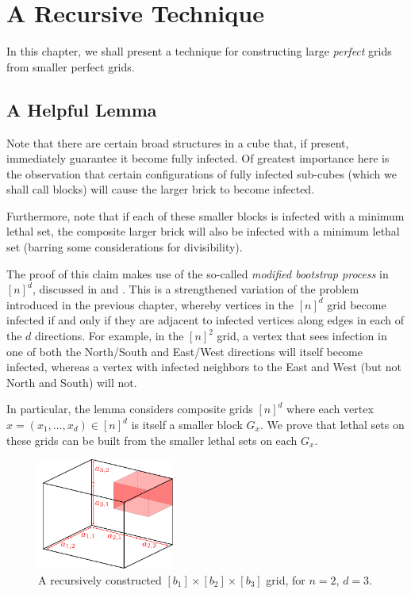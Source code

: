 \chapter{A Recursive Technique}

In this chapter, we shall present a technique for constructing large \emph{perfect} grids from smaller perfect grids. 

\section{A Helpful Lemma}

Note that there are certain broad structures in a cube that, if present, immediately guarantee it become fully infected. Of greatest importance here is the observation that certain configurations of fully infected sub-cubes (which we shall call blocks) will cause the larger brick to become infected. 


Furthermore, note that if each of these smaller blocks is infected with a minimum lethal set, the composite larger brick will also be infected with a minimum lethal set (barring some considerations for divisibility).

The proof of this claim makes use of the so-called \emph{modified bootstrap process} in $[n]^d$, discussed in \cite{some paper} and \cite{some other paper}. This is a strengthened variation of the problem introduced in the previous chapter, whereby vertices in the $[n]^d$ grid become infected if and only if they are adjacent to infected vertices along edges in each of the $d$ directions. For example, in the $[n]^2$ grid, a vertex that sees infection in one of both the North/South and East/West directions will itself become infected, whereas a vertex with infected neighbors to the East and West (but not North and South) will not. 

In particular, the lemma considers composite grids $[n]^d$ where each vertex $x = (x_1, \dots, x_d) \in [n]^d$ is itself a smaller block $G_x$. We prove that lethal sets on these grids can be built from the smaller lethal sets on each $G_x$. 

\begin{figure}[]
\centering
\includegraphics[width=0.4\textwidth]{figures/2/recursion.pdf}
\caption{A recursively constructed $[b_1] \times [b_2] \times [b_3]$ grid, for $n = 2$, $d = 3$.}
\label{fig:recursion}
\end{figure} 

